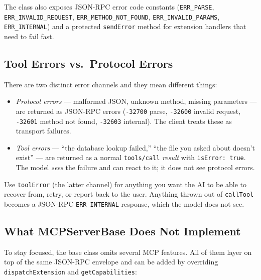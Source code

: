 \noindent
The class also exposes JSON-RPC error code constants (\texttt{ERR\_PARSE}, \texttt{ERR\_INVALID\_REQUEST}, \texttt{ERR\_METHOD\_NOT\_FOUND}, \texttt{ERR\_INVALID\_PARAMS}, \texttt{ERR\_INTERNAL}) and a protected \texttt{sendError} method for extension handlers that need to fail fast.

\subsection{Tool Errors vs.\ Protocol Errors}

There are two distinct error channels and they mean different things:

\begin{itemize}
  \item \emph{Protocol errors} --- malformed JSON, unknown method, missing parameters --- are returned as JSON-RPC errors (\texttt{-32700} parse, \texttt{-32600} invalid request, \texttt{-32601} method not found, \texttt{-32603} internal).  The client treats these as transport failures.
  \item \emph{Tool errors} --- ``the database lookup failed,'' ``the file you asked about doesn't exist'' --- are returned as a normal \texttt{tools/call} \emph{result} with \texttt{isError: true}.  The model \emph{sees} the failure and can react to it; it does not see protocol errors.
\end{itemize}

\noindent
Use \texttt{toolError} (the latter channel) for anything you want the AI to be able to recover from, retry, or report back to the user.  Anything thrown out of \texttt{callTool} becomes a JSON-RPC \texttt{ERR\_INTERNAL} response, which the model does not see.

\subsection{What MCPServerBase Does Not Implement}

To stay focused, the base class omits several MCP features.  All of them layer on top of the same JSON-RPC envelope and can be added by overriding \texttt{dispatchExtension} and \texttt{getCapabilities}:

